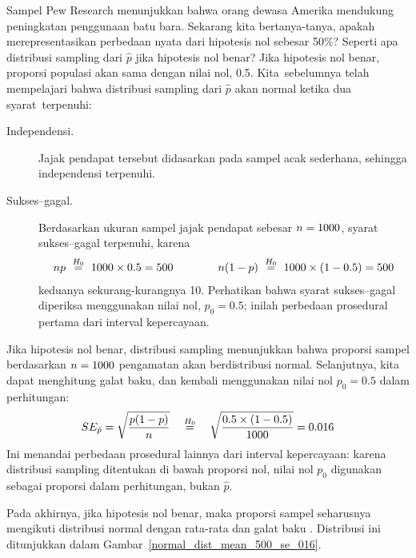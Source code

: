 \begin{examplewrap}
\begin{nexample}{Sampel Pew Research menunjukkan bahwa
    \pewcoalpollpercent{}
    orang dewasa Amerika mendukung peningkatan penggunaan batu bara.
    Sekarang kita bertanya-tanya, apakah \pewcoalpollpercent{} merepresentasikan
    perbedaan nyata dari hipotesis nol sebesar 50\%?
    Seperti apa distribusi sampling dari $\hat{p}$
    jika hipotesis nol benar?}
  Jika hipotesis nol benar, proporsi populasi
  akan sama dengan nilai nol, 0.5.
  Kita~sebelumnya telah mempelajari bahwa
  distribusi sampling dari $\hat{p}$ akan normal ketika
  dua syarat~terpenuhi:
  \begin{description}
    \item[Independensi.]
        Jajak pendapat tersebut didasarkan pada sampel acak sederhana,
        sehingga independensi terpenuhi.
    \item[Sukses--gagal.]
        Berdasarkan ukuran sampel jajak pendapat sebesar
        $n = 1000{}$,
        syarat sukses--gagal terpenuhi, karena
        \begin{align*}
        np ~ \stackrel{H_0}{=}
            ~ 1000{} \times 0.5{}
            = 500
        \qquad\qquad
        n (1 - p) ~ \stackrel{H_0}{=}
            ~ 1000{} \times
                (1 - 0.5{})
            = 500
        \end{align*}
        keduanya sekurang-kurangnya 10.
        Perhatikan bahwa syarat sukses--gagal diperiksa
        menggunakan nilai nol, $p_0 = 0.5$;
        inilah perbedaan prosedural pertama dari
        interval kepercayaan.
  \end{description}
  Jika hipotesis nol benar, distribusi sampling
  menunjukkan bahwa proporsi sampel berdasarkan
  $n = 1000{}$ pengamatan
  akan berdistribusi normal. Selanjutnya, kita dapat menghitung galat
  baku, dan kembali menggunakan nilai nol $p_0 = 0.5$ dalam
  perhitungan:
  \begin{align*}
  SE_{\hat{p}}
    = \sqrt{\frac{p (1 - p)}{n}}
    \quad \stackrel{H_0}{=} \quad
        \sqrt{\frac{0.5{} \times
            (1 - 0.5{})}{1000{}}}
    = 0.016{}
  \end{align*}
  Ini menandai perbedaan prosedural lainnya dari interval
  kepercayaan: karena distribusi sampling ditentukan
  di bawah proporsi nol, nilai nol $p_0$ digunakan sebagai
  proporsi dalam perhitungan, bukan $\hat{p}$.

  Pada akhirnya, jika hipotesis nol benar, maka proporsi
  sampel seharusnya mengikuti distribusi normal dengan rata-rata
  \pewcoalpollnullvalue{}
  dan galat baku \pewcoalpollnullse{}.
  Distribusi ini ditunjukkan dalam
  Gambar~\ref{normal_dist_mean_500_se_016}.
\end{nexample}
\end{examplewrap}

